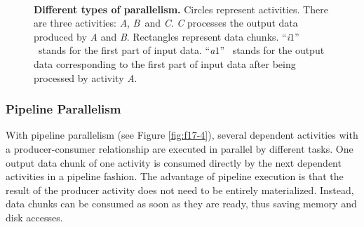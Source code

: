 \begin{figure}
\begin{centering}
		\\

	\end{centering}
	\caption{\textbf{Different types of parallelism. } Circles
          represent activities. There are three activities:
          \textit{A}, \textit{B}~and \textit{C}. \textit{C}
          processes the output data produced by \textit{A}
          and \textit{B}.
Rectangles represent
          data chunks. \textquotedblleft\textit{i\tiny{$1$}}\textquotedblright
          ~stands for the first part of input
          data.
\textquotedblleft\textit{a\tiny{$1$}}\textquotedblright
          ~stands for the output data corresponding to the first part
          of input data after being processed by activity
          \textit{A}.}

\label{fig:f17} 
\end{figure} 

\subsubsection*{Pipeline Parallelism}
With pipeline parallelism (see Figure \ref{fig:f17-4}), several
dependent activities with a producer-consumer relationship are
executed in parallel by different tasks.
One output data chunk of one 
activity is consumed directly by the next dependent activities in a
pipeline fashion. 
The advantage of pipeline execution is that the result
of the producer activity does not need to be entirely materialized.
Instead, data chunks can be consumed as soon as they are ready,
thus saving memory and disk accesses.

